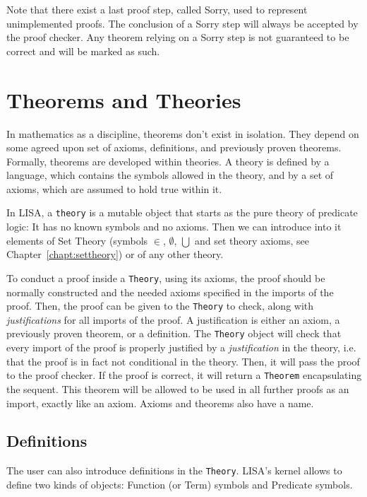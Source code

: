 Note that there exist a last proof step, called Sorry, used to  represent unimplemented proofs. The conclusion of a Sorry step will always be accepted by the proof checker. Any theorem relying on a Sorry step is not guaranteed to be correct and will be marked as such.


\section{Theorems and Theories}
\label{sect:TheoremsAndTheories}

In mathematics as a discipline, theorems don't exist in isolation. They depend on some agreed upon set of axioms, definitions, and previously proven theorems. Formally, theorems are developed within theories. A theory is defined by a language, which contains the symbols allowed in the theory, and by a set of axioms, which are assumed to hold true within it.

In LISA, a \lstinline{theory}{} is a mutable object that starts as the pure theory of predicate logic: It has no known symbols and no axioms. Then we can introduce into it elements of Set Theory (symbols $\in$, $\emptyset$, $\bigcup$ and set theory axioms, see Chapter~\ref{chapt:settheory}) or of any other theory.

To conduct a proof inside a \lstinline{Theory}{}, using its axioms, the proof should be normally constructed and the needed axioms specified in the imports of the proof. Then, the proof can be given to the \lstinline{Theory}{} to check, along with \textit{justifications} for all imports of the proof. A justification is either an axiom, a previously proven theorem, or a definition. The \lstinline{Theory}{} object will check that every import of the proof is properly justified by a \textit{justification} in the theory, i.e. that the proof is in fact not conditional in the theory. Then, it will pass the proof to the proof checker. If the proof is correct, it will return a \lstinline{Theorem}{} encapsulating the sequent. This theorem will be allowed to be used in all further proofs as an import, exactly like an axiom. Axioms and theorems also have a name.

\subsection{Definitions}
\label{subsec:definitions}
The user can also introduce definitions in the \lstinline{Theory}{}.
LISA's kernel allows to define two kinds of objects: Function (or Term) symbols and Predicate symbols. 


